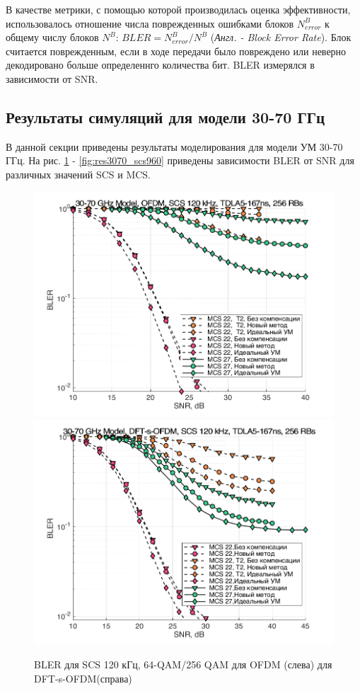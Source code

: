 В качестве метрики, с помощью которой производилась оценка эффективности,
использовалось отношение числа поврежденных ошибками блоков $N^B_{error}$ к общему числу
блоков $N^B$: $BLER = N^B_{error} / N^B$ (\textit{Англ. - Block Error
Rate}). Блок считается поврежденным, если в ходе передачи было повреждено
или неверно декодировано больше определеннго количества бит. BLER измерялся
в зависимости от SNR.

\subsection{Результаты симуляций для модели 30-70 ГГц}
В данной секции приведены результаты моделирования для модели УМ 30-70 ГГц. 
На рис. \ref{fig:res3070_scs120} - \ref{fig:res3070_scs960} приведены
зависимости BLER от SNR для различных значений SCS и MCS.
\begin{figure}[h!]
    \centering
    \includegraphics[width=0.49\linewidth]{figs/res/ofdm/OFDM_Nokia_SCS120_MCS22_27.png}
    \includegraphics[width=0.49\linewidth]{figs/res/dftsofdm/DFT-s-OFDM_Nokia_SCS120_MCS22_27.png}
    \caption{BLER для SCS 120 кГц, 64-QAM/256 QAM для OFDM (слева) для DFT-s-OFDM(справа)}
    \label{fig:res3070_scs120}
\end{figure}

